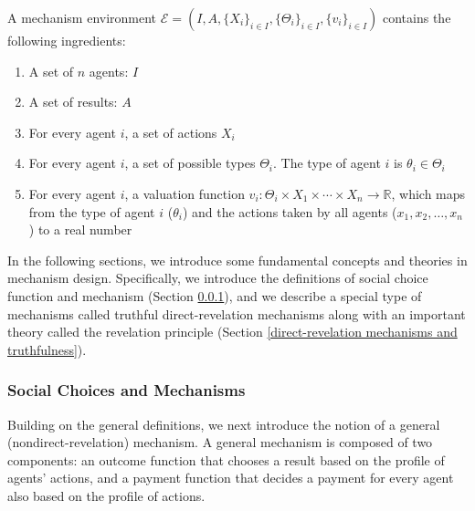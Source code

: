 \documentclass[11pt]{phdthesis}
\begin{document}
\begin{definition}
    A mechanism environment \sloppy $ \mathcal{E} = (I, A, \{X_i\}_{i \in I}, \{\Theta_{i}\}_{i \in I}, \{v_i\}_{i \in I}) $ contains the following ingredients:
    \begin{enumerate}
        \item A set of $n$ agents: $I$
        \item A set of results: $ A $
        \item For every agent $i$, a set of actions $X_i$
        \item For every agent $i$, a set of possible types $\Theta_i$. The type of agent $i$ is $\theta_i \in \Theta_i$
        \item For every agent $i$, a valuation function $v_i:\Theta_i \times X_1 \times \cdots \times X_n \rightarrow \mathbb{R}$, which maps from the type of agent $i$ ($ \theta_i $) and the actions taken by all agents ($ x_1,x_2,\ldots, x_n $) to a real number~\citep[Definition 9.40]{nisan2007algorithmic}
    \end{enumerate}
\end{definition}

In the following sections, we introduce some fundamental concepts and theories in mechanism design. Specifically, we introduce the definitions of social choice function and mechanism (Section \ref{social choices and mechanisms}), and we describe a special type of mechanisms called truthful direct-revelation mechanisms along with an important theory called the revelation principle (Section \ref{direct-revelation mechanisms and truthfulness}).
\subsubsection{Social Choices and Mechanisms} \label{social choices and mechanisms}

Building on the general definitions, we next introduce the notion of a general (nondirect-revelation) mechanism. A general mechanism is composed of two components: an outcome function that chooses a result based on the profile of agents' actions, and a payment function that decides a payment for every agent also based on the profile of actions.
\end{document}
